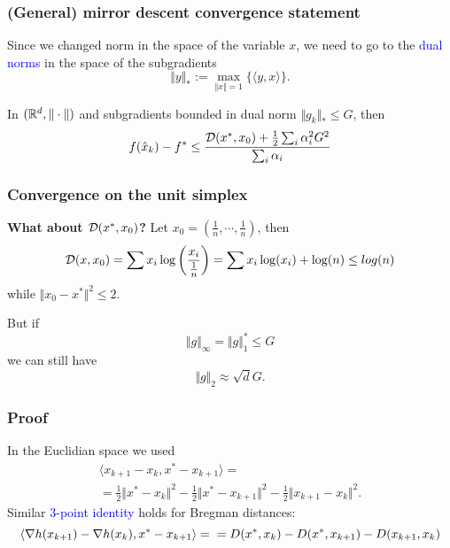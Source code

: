 \documentclass{beamer}
\begin{document}
%
\begin{frame}
  \frametitle{(General) mirror descent convergence statement}
  Since we changed norm in the space of the variable $x$, we need to go to the \textcolor{blue}{dual norms} in the space of the subgradients
  \begin{equation}
    \Vert y \Vert_* := \max_{\Vert x \Vert=1} \{ \langle y, x \rangle\}.
  \end{equation}
  \begin{theorem}
    In $(\mathbb{R}^d, \Vert \cdot \Vert)$ and subgradients bounded in dual norm $\Vert g_k \Vert_* \le G$, then
    \begin{equation}
      f(\hat{x}_k) - f^* \le \frac{\mathcal{D}(x^*, x_0) + \frac12 \sum_i \alpha_i^2 G^2}{\sum_i \alpha_i}
    \end{equation}
  \end{theorem}

\end{frame}

\begin{frame}
  \frametitle{Convergence on the unit simplex}
    \textbf{What about $\mathcal{D}(x^*, x_0) $?}
    Let $x_0 = (\frac{1}{n}, \cdots , \frac{1}{n})$, then
    \begin{equation}
      \mathcal{D}(x, x_0) = \sum x_i \log\left(\frac{x_i}{\frac1n}\right) = \sum x_i \log(x_i) + \log(n) \le log(n)
    \end{equation}
    while $ \Vert x_0 - x^* \Vert^2 \le 2$.

    But if
    \begin{equation}
      \Vert g \Vert_\infty = \Vert g \Vert_1^* \le G
    \end{equation}
    we can still have
    \begin{equation}
      \Vert g \Vert_2 \approx \sqrt{d} G.
    \end{equation}
\end{frame}

\begin{frame}
  \frametitle{Proof}
  In the Euclidian space we used
  \begin{align}
    \langle x_{k+1}-x_k, x^* -x_{k+1} \rangle =\\
    = \frac12 \Vert x^*-x_k \Vert^2 - \frac12 \Vert x^*-x_{k+1} \Vert^2 - \frac12 \Vert x_{k+1}-x_k \Vert^2.
  \end{align}
  Similar \textcolor{blue}{$3$-point identity} holds for Bregman distances:
  \begin{equation}
    \langle \nabla h(x_{k+1})-\nabla h(x_k), x^*-x_{k+1} \rangle =\\
    = D(x^*, x_k) - D(x^*, x_{k+1}) - D(x_{k+1}, x_k)
  \end{equation}

\end{frame}
\end{document}
